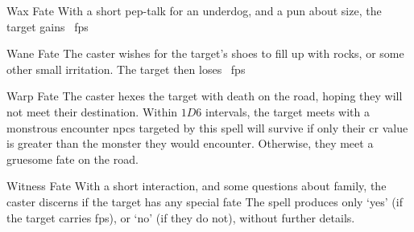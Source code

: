 \ifodd\value{diceNo}

  {}%
  {Wax}%
  {Fate}%
  {}%
  {With a short pep-talk for an underdog, and a pun about size, the target gains \showDam~\glspl{fp}}%
  {}

  {}%
  {Wane}%
  {Fate}%
  {}%
  {The caster wishes for the target's shoes to fill up with rocks, or some other small irritation.
    The target then loses \showDam~\glspl{fp}}%
  {}

\else

  {}%
  {Warp}%
  {Fate}%
  {}%
  {The caster hexes the target with death on the road, hoping they will not meet their destination.
    Within $1D6$ \glspl{interval}, the target meets with a monstrous encounter}%
  {
    \Glspl{npc} targeted by this spell will survive if only their \gls{cr} value is greater than the monster they would encounter.
    Otherwise, they meet a gruesome fate on the road.
  }

  {}%
  {Witness}%
  {Fate}%
  {}%
  {With a short interaction, and some questions about family, the caster discerns if the target has any special fate}%
  {The spell produces only `yes' (if the target carries \glspl{fp}), or `no' (if they do not), without further details.}

\fi
{}
